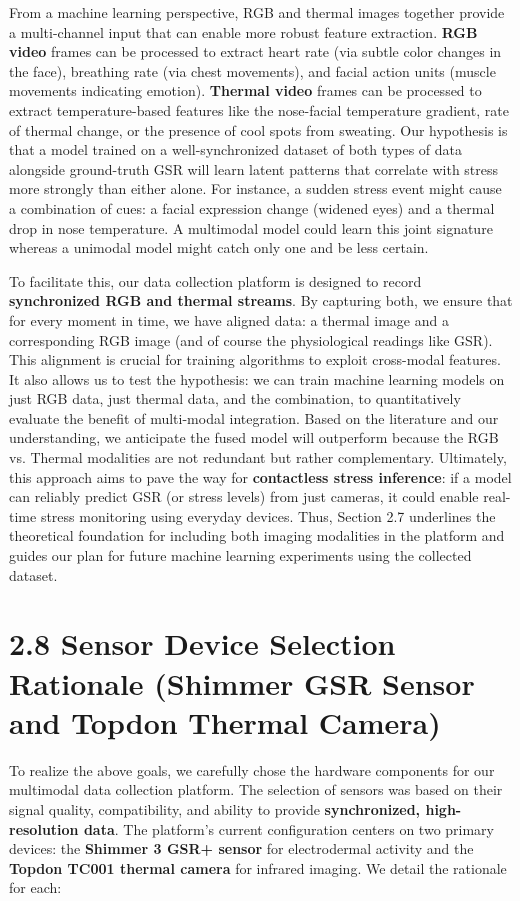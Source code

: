 \documentclass[11pt,a4paper]{report}
\begin{document}
From a machine learning perspective, RGB and thermal images together
provide a multi-channel input that can enable more robust feature
extraction. \textbf{RGB video} frames can be processed to extract heart rate
(via subtle color changes in the face), breathing rate (via chest
movements), and facial action units (muscle movements indicating
emotion). \textbf{Thermal video} frames can be processed to extract
temperature-based features like the nose-facial temperature gradient,
rate of thermal change, or the presence of cool spots from sweating. Our
hypothesis is that a model trained on a well-synchronized dataset of
both types of data alongside ground-truth GSR will learn latent patterns
that correlate with stress more strongly than either alone. For
instance, a sudden stress event might cause a combination of cues: a
facial expression change (widened eyes) and a thermal drop in nose
temperature. A multimodal model could learn this joint signature whereas
a unimodal model might catch only one and be less certain.

To facilitate this, our data collection platform is designed to record
\textbf{synchronized RGB and thermal streams}. By capturing both, we ensure
that for every moment in time, we have aligned data: a thermal image and
a corresponding RGB image (and of course the physiological readings like
GSR). This alignment is crucial for training algorithms to exploit
cross-modal features. It also allows us to test the hypothesis: we can
train machine learning models on just RGB data, just thermal data, and
the combination, to quantitatively evaluate the benefit of multi-modal
integration. Based on the literature and our understanding, we
anticipate the fused model will outperform because the RGB vs. Thermal
modalities are not redundant but rather complementary. Ultimately, this
approach aims to pave the way for \textbf{contactless stress inference}: if a
model can reliably predict GSR (or stress levels) from just cameras, it
could enable real-time stress monitoring using everyday devices. Thus,
Section 2.7 underlines the theoretical foundation for including both
imaging modalities in the platform and guides our plan for future
machine learning experiments using the collected dataset.

\section{2.8 Sensor Device Selection Rationale (Shimmer GSR Sensor and Topdon Thermal Camera)}

To realize the above goals, we carefully chose the hardware components
for our multimodal data collection platform. The selection of sensors
was based on their signal quality, compatibility, and ability to provide
\textbf{synchronized, high-resolution data}. The platform's current
configuration centers on two primary devices: the \textbf{Shimmer 3 GSR+
sensor} for electrodermal activity and the \textbf{Topdon TC001 thermal
camera} for infrared imaging. We detail the rationale for each:
\end{document}
